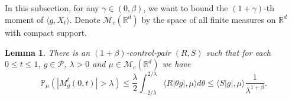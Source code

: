 \documentclass[12pt,oneside,english]{amsart}
\theoremstyle{plain}
\newtheorem{lem}[thm]{Lemma}
\theoremstyle{definition}
\numberwithin{equation}{section}
\begin{document}
\begin{comment}
    Therefore, for any $\mu\in \mathcal M(\mathbb R^d)$ with compact support, $k \in \mathbb{N}$, $\theta \in \mathbb{R}$ and $0\leq s\leq1$, using Jensen's inequality,
\begin{align*}
    &|\varphi_{k,\mu,s}(\theta)-1- \langle Z_{g_k}(s,\cdot, \theta),\mu\rangle|\\
    &\leq |\langle v_{g_k}(s,\cdot,\theta)-i\theta T_s^{\alpha}g_k, \mu \rangle|^2 + \langle |v_{g_k}(s,\cdot,\theta)-\tilde{v}_{g_k}(s,\cdot,\theta)|, \mu \rangle
    \\&\leq \langle |v_{g_k}(s,\cdot,\theta)-i\theta T_s^{\alpha}g_k|^2, \mu \rangle + \langle |v_{g_k}(s,\cdot,\theta)-\tilde{v}_{g_k}(s,\cdot,\theta)|, \mu \rangle
    \\&\leq e^{2\alpha}|C_g\theta e^{(\alpha-\kappa b)k+\alpha}|^{2+2\beta}\langle (\tilde R^g)^2,\mu\rangle + |C_g\theta e^{(\alpha-\kappa b)k}|^{1+2\beta}\langle R^g_1,\mu\rangle.
    \qedhere
\end{align*}
\end{proof}
\end{comment}

\subsection{}

 In this subsection, for any $\gamma \in (0,\beta)$, we want to bound the $(1+\gamma)$-th moment of $\langle g ,X_t \rangle$. Denote $\mathcal{M}_c(\mathbb{R}^d)$ by the space of all finite measures on $\mathbb{R}^d$ with compact support.
\begin{lem}
\label{lem: control pair for P(M>lambda)}
    There is an $(1+\beta)$-control-pair $(R,S)$ such that for each $0\leq t\leq 1$, $g\in \mathcal P$, $\lambda >0$ and $\mu\in \mathcal M_c(\mathbb R^d)$ we have
\[
    \mathbb P_\mu (|M^t_g(0,t)| > \lambda)
    \leq \frac{\lambda}{2}\int_{-2/\lambda}^{2/\lambda}\langle R|\theta g|,\mu\rangle d\theta
    \leq \langle S| g|,\mu\rangle \frac{1}{\lambda^{1+\beta}}.
\]
\end{lem}
\end{document}
